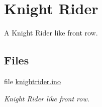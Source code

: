 \hypertarget{group__knightrider}{}\section{Knight Rider}
\label{group__knightrider}


A Knight Rider like front row.  


\subsection*{Files}
\begin{DoxyCompactItemize}
\item 
file \hyperlink{knightrider_8ino}{knightrider.\+ino}
\begin{DoxyCompactList}\small\item\em Knight Rider like front row. \end{DoxyCompactList}\end{DoxyCompactItemize}
